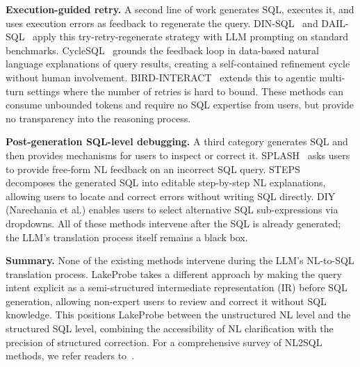 \vspace{.25em}\noindent\textbf{Execution-guided retry.}
A second line of work generates SQL, executes it, and uses execution errors as feedback to regenerate the query. DIN-SQL~\cite{pourreza2023dinsql} and DAIL-SQL~\cite{gao2023dailsql} apply this try-retry-regenerate strategy with LLM prompting on standard benchmarks. CycleSQL~\cite{fan2025cyclesql} grounds the feedback loop in data-based natural language explanations of query results, creating a self-contained refinement cycle without human involvement. BIRD-INTERACT~\cite{huo2025birdinteract} extends this to agentic multi-turn settings where the number of retries is hard to bound. These methods can consume unbounded tokens and require no SQL expertise from users, but provide no transparency into the reasoning process.

\vspace{.25em}\noindent\textbf{Post-generation SQL-level debugging.}
A third category generates SQL and then provides mechanisms for users to inspect or correct it. SPLASH~\cite{elgohary-etal-2020-speak} asks users to provide free-form NL feedback on an incorrect SQL query. STEPS~\cite{tian2024steps} decomposes the generated SQL into editable step-by-step NL explanations, allowing users to locate and correct errors without writing SQL directly. DIY (Narechania et al.) enables users to select alternative SQL sub-expressions via dropdowns. All of these methods intervene after the SQL is already generated; the LLM's translation process itself remains a black box.

\vspace{.25em}\noindent\textbf{Summary.}
None of the existing methods intervene during the LLM's NL-to-SQL translation process. {\sf LakeProbe} takes a different approach by making the query intent explicit as a semi-structured intermediate representation (IR) before SQL generation, allowing non-expert users to review and correct it without SQL knowledge. This positions {\sf LakeProbe} between the unstructured NL level and the structured SQL level, combining the accessibility of NL clarification with the precision of structured correction. For a comprehensive survey of NL2SQL methods, we refer readers to~\cite{liu2024nl2sqlsurvey,luo2025nl2sqlsurvey}.




